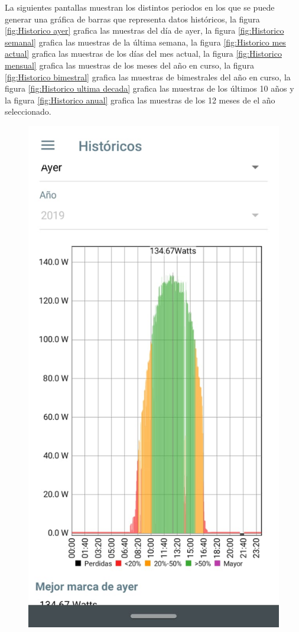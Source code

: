La siguientes pantallas muestran los distintos periodos en los que se puede generar una gráfica de barras que representa datos históricos, la figura \ref{fig:Historico ayer} grafica las muestras del día de ayer, la figura \ref{fig:Historico semanal} grafica las muestras de la última semana, la figura \ref{fig:Historico mes actual} grafica las muestras de los días del mes actual, la figura \ref{fig:Historico mensual} grafica las muestras de los meses del año en curso, la figura \ref{fig:Historico bimestral} grafica las muestras de bimestrales del año en curso, la figura \ref{fig:Historico ultima decada} grafica las muestras de los últimos 10 años y la figura \ref{fig:Historico anual} grafica las muestras de los 12 meses de el año seleccionado.

\begin{figure}[H]
	\centering
	\includegraphics[scale=0.4]{Capitulo4/software/submodulos/images/man25.png}

\end{figure}
